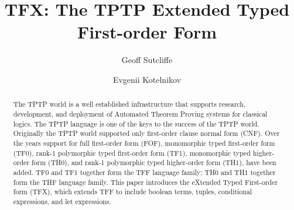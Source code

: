 \documentclass{easychair}
\begin{document}
\title{TFX: The TPTP Extended Typed First-order Form}
\author{
    Geoff Sutcliffe
\and
    Evgenii Kotelnikov
}
\clearpage
\maketitle

\begin{abstract}
The TPTP world is a well established infrastructure that supports research, 
development, and deployment of Automated Theorem Proving systems for 
classical logics. 
The TPTP language is one of the keys to the success of the TPTP world. 
Originally the TPTP world supported only first-order clause normal form (CNF). 
Over the years support for full first-order form (FOF), monomorphic typed 
first-order form (TF0), rank-1 polymorphic typed first-order form (TF1), 
monomorphic typed higher-order form (TH0), and rank-1 polymorphic typed 
higher-order form (TH1), have been added. 
TF0 and TF1 together form the TFF language family; TH0 and TH1 together form 
the THF language family. 
This paper introduces the eXtended Typed First-order form (TFX), which extends
TFF to include boolean terms, tuples, conditional expressions, and let 
expressions.
\end{abstract}

\newcommand{\binding}[2]{{#1}={#2}}
\newcommand{\ite}[3]{\mathtt{if}\;{#1}\;\allowbreak\mathtt{then}\;{#2}\;\allowbreak\mathtt{else}\;{#3}}
\newcommand{\letin}[3]{\mathtt{let}\;\binding{#1}{#2}\;\allowbreak\mathtt{in}\;{#3}}
\newcommand{\letinpar}[5]{\mathtt{let}\;\binding{#1}{#2};\;\binding{#3}{#4}\;\mathtt{in}\;{#5}}
\newcommand{\letindef}[2]{\mathtt{let}\;{#1}\;\allowbreak\mathtt{in}\;{#2}}
\newcommand{\letnl}[3]{\begin{aligned}[t]\mathtt{let}\;&\binding{#1}{#2}\\[-0.2em]\mathtt{in}\;&{#3}\end{aligned}}
\newcommand{\letinnl}[3]{\begin{aligned}[t]&\mathtt{let}\;\binding{#1}{#2}\;\mathtt{in}\\[-0.2em]&\quad{#3}\end{aligned}}
\newcommand{\itenll}[3]{\begin{aligned}[t]&\mathtt{if}\;{#1}\\[-0.2em]&\mathtt{then}\;{#2}\\[-0.2em]&\mathtt{else}\;{#3}\end{aligned}}
\newcommand{\tuple}[1]{({#1})}
\end{document}
